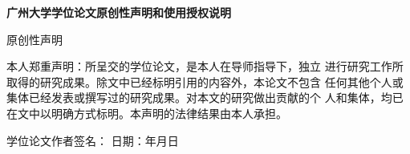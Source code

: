 ﻿%
    \newpage
   \thispagestyle{empty}
    \begin{center}
    {\LARGE \bf{广州大学学位论文原创性声明和使用授权说明}}
   \vspace{0.5cm}
    \parbox[t][1cm][c]{\textwidth}{ {\bf \Large \centerline
    {原创性声明} } }
    \parbox[t][3cm][c]{\textwidth}{ {\fontsize{12pt}{18pt}\selectfont
    \hspace{2em}本人郑重声明：所呈交的学位论文，是本人在导师指导下，独立
    进行研究工作所取得的研究成果。除文中已经标明引用的内容外，本论文不包含
    任何其他个人或集体已经发表或撰写过的研究成果。对本文的研究做出贡献的个
    人和集体，均已在文中以明确方式标明。本声明的法律结果由本人承担。}}
    \parbox[t][2cm][c]{\textwidth}{\fontsize{12pt}{15pt}\selectfont
    \hspace{2em}%
    学位论文作者签名：
    \hspace*{3.3cm} 日期：\hspace{2em}年\hspace{2em}月\hspace{2em}日
    }


\end{center}
